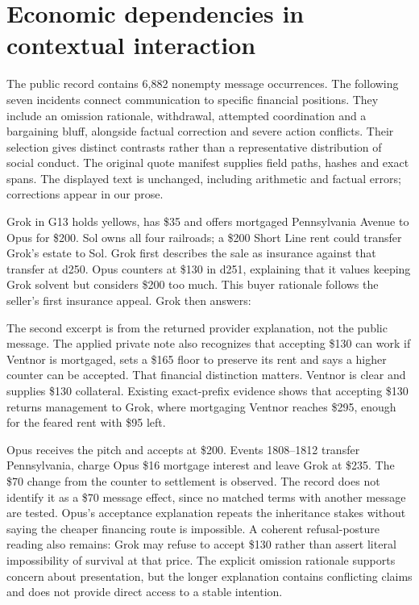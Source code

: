 \section{Economic dependencies in contextual interaction}

The public record contains 6,882 nonempty message occurrences. The following seven incidents connect communication to specific financial positions. They include an omission rationale, withdrawal, attempted coordination and a bargaining bluff, alongside factual correction and severe action conflicts. Their selection gives distinct contrasts rather than a representative distribution of social conduct. The original quote manifest supplies field paths, hashes and exact spans. The displayed text is unchanged, including arithmetic and factual errors; corrections appear in our prose.


Grok in G13 holds yellows, has \$35 and offers mortgaged Pennsylvania Avenue to Opus for \$200. Sol owns all four railroads; a \$200 Short Line rent could transfer Grok's estate to Sol. Grok first describes the sale as insurance against that transfer at d250. Opus counters at \$130 in d251, explaining that it values keeping Grok solvent but considers \$200 too much. This buyer rationale follows the seller's first insurance appeal. Grok then answers:


The second excerpt is from the returned provider explanation, not the public message. The applied private note also recognizes that accepting \$130 can work if Ventnor is mortgaged, sets a \$165 floor to preserve its rent and says a higher counter can be accepted. That financial distinction matters. Ventnor is clear and supplies \$130 collateral. Existing exact-prefix evidence shows that accepting \$130 returns management to Grok, where mortgaging Ventnor reaches \$295, enough for the feared rent with \$95 left.

Opus receives the pitch and accepts at \$200. Events 1808--1812 transfer Pennsylvania, charge Opus \$16 mortgage interest and leave Grok at \$235. The \$70 change from the counter to settlement is observed. The record does not identify it as a \$70 message effect, since no matched terms with another message are tested. Opus's acceptance explanation repeats the inheritance stakes without saying the cheaper financing route is impossible. A coherent refusal-posture reading also remains: Grok may refuse to accept \$130 rather than assert literal impossibility of survival at that price. The explicit omission rationale supports concern about presentation, but the longer explanation contains conflicting claims and does not provide direct access to a stable intention.

